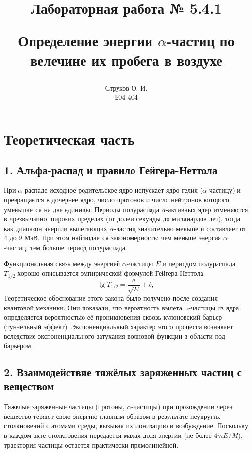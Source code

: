 \documentclass[12pt, a4paper]{article}
\begin{document}
\title{\begin{center}Лабораторная работа № 5.4.1\end{center}
Определение энергии $\alpha$-частиц по велечине их пробега в воздухе}
\author{Струков О. И. \\ Б04-404}
\date{}

\thispagestyle{empty}
\maketitle
\newpage
{}



\section*{Теоретическая часть}

\subsection*{1. Альфа-распад и правило Гейгера-Неттола}
При $\alpha$-распаде исходное родительское ядро испускает ядро гелия ($\alpha$-частицу) и превращается в дочернее ядро, число протонов и число нейтронов которого уменьшается на две единицы. Периоды полураспада $\alpha$-активных ядер изменяются в чрезвычайно широких пределах (от долей секунды до миллиардов лет), тогда как диапазон энергии вылетающих $\alpha$-частиц значительно меньше и составляет от 4 до 9 МэВ. При этом наблюдается закономерность: чем меньше энергия $\alpha$-частиц, тем больше период полураспада. 

Функциональная связь между энергией $\alpha$-частицы $E$ и периодом полураспада $T_{1/2}$ хорошо описывается эмпирической формулой Гейгера-Неттола:
\begin{equation}
    \lg T_{1/2} = \frac{a}{\sqrt{E}} + b,
\end{equation}
Теоретическое обоснование этого закона было получено после создания квантовой механики. Они показали, что вероятность вылета $\alpha$-частицы из ядра определяется вероятностью её проникновения сквозь кулоновский барьер (туннельный эффект). Экспоненциальный характер этого процесса возникает вследствие экспоненциального затухания волновой функции в области под барьером.

\subsection*{2. Взаимодействие тяжёлых заряженных частиц с веществом}
Тяжелые заряженные частицы (протоны, $\alpha$-частицы) при прохождении через вещество теряют свою энергию главным образом в результате неупругих столкновений с атомами среды, вызывая их ионизацию и возбуждение. Поскольку в каждом акте столкновения передается малая доля энергии (не более $4mE/M$), траектория частицы остается практически прямолинейной.
\end{document}
